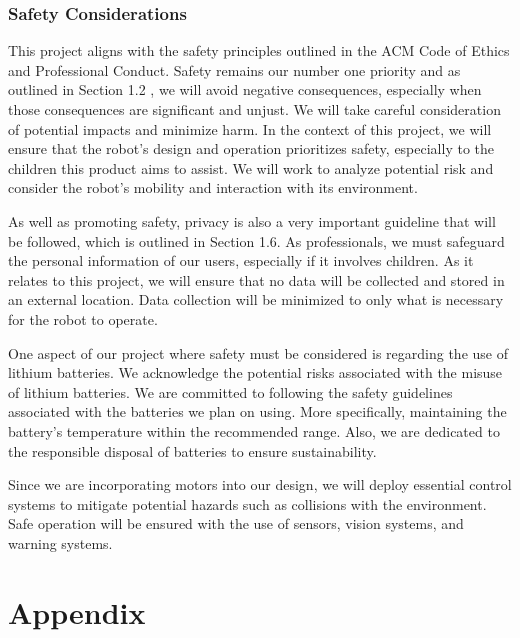 \documentclass{report}
\begin{document}
    \subsection{Safety Considerations}
    This project aligns with the safety principles outlined in the ACM Code of Ethics and Professional Conduct. Safety remains our number one priority and as outlined in Section 1.2 \cite{ACM_2018}, we will avoid negative consequences, especially when those consequences are significant and unjust. We will take careful consideration of potential impacts and minimize harm. In the context of this project, we will ensure that the robot’s design and operation prioritizes safety, especially to the children this product aims to assist. We will work to analyze potential risk and consider the robot’s mobility and interaction with its environment.

    As well as promoting safety, privacy is also a very important guideline that will be followed, which is outlined in Section 1.6. As professionals, we must safeguard the personal information of our users, especially if it involves children. As it relates to this project, we will ensure that no data will be collected and stored in an external location. Data collection will be minimized to only what is necessary for the robot to operate.

    One aspect of our project where safety must be considered is regarding the use of lithium batteries. We acknowledge the potential risks associated with the misuse of lithium batteries. We are committed to following the safety guidelines associated with the batteries we plan on using. More specifically, maintaining the battery’s temperature within the recommended range. Also, we are dedicated to the responsible disposal of batteries to ensure sustainability.

    Since we are incorporating motors into our design, we will deploy essential control systems to mitigate potential hazards such as collisions with the environment. Safe operation will be ensured with the use of sensors, vision systems, and warning systems.

    \appendix

    \chapter{Appendix}
\end{document}
